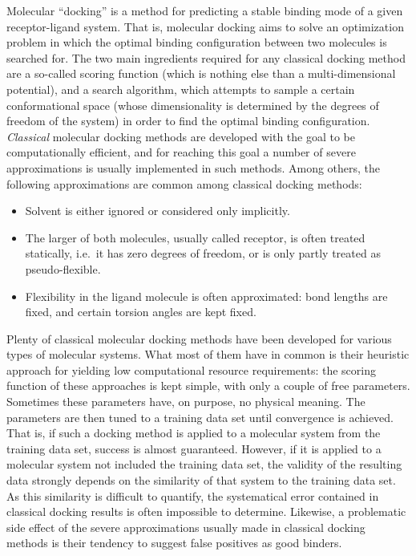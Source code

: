 Molecular \enquote{docking} is a method for predicting a stable binding mode of
a given receptor-ligand system. That is, molecular docking aims to solve an
optimization problem in which the optimal binding configuration between two
molecules is searched for. The two main ingredients required for any classical
docking method are a so-called scoring function (which is nothing else than a
multi-dimensional potential), and a search algorithm, which attempts to sample a
certain conformational space (whose dimensionality is determined by the degrees
of freedom of the system) in order to find the optimal binding configuration.
\textit{Classical} molecular docking methods are developed with the goal to be
computationally efficient, and for reaching this goal a number of severe
approximations is usually implemented in such methods. Among others, the
following approximations are common among classical docking methods:

\begin{itemize}
\item Solvent is either ignored or considered only implicitly.
\item The larger of both molecules, usually called receptor, is often treated
statically, i.e.\ it has zero degrees of freedom, or is only partly treated as
pseudo-flexible.
\item Flexibility in the ligand molecule is often approximated: bond lengths are
fixed, and certain torsion angles are kept fixed.
\end{itemize}

Plenty of classical molecular docking methods have been developed for various
types of molecular systems. What most of them have in common is their heuristic
approach for yielding low computational resource requirements: the scoring
function of these approaches is kept simple, with only a couple of free
parameters. Sometimes these parameters have, on purpose, no physical meaning.
The parameters are then tuned to a training data set until convergence is
achieved. That is, if such a docking method is applied to a molecular system
from the training data set, success is almost guaranteed. However, if it is
applied to a molecular system not included the training data set, the validity
of the resulting data strongly depends on the similarity of that system to the
training data set. As this similarity is difficult to quantify, the systematical
error contained in classical docking results is often impossible to determine.
Likewise, a problematic side effect of the severe approximations usually made in
classical docking methods is their tendency to suggest false positives as good
binders.


